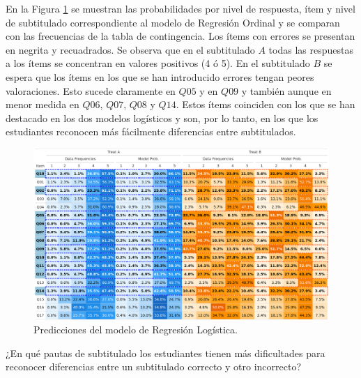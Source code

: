 \documentclass[
  12pt,
  a4paper,
  extrafontsizes,
  onecolumn,
  openright,
  table]{memoir}
\begin{document}
En la Figura \ref{fig-prob-compare} se muestran las probabilidades por
nivel de respuesta, ítem y nivel de subtitulado correspondiente al
modelo de Regresión Ordinal y se comparan con las frecuencias de la
tabla de contingencia. Los ítems con errores se presentan en negrita y
recuadrados. Se observa que en el subtitulado \(A\) todas las respuestas
a los ítems se concentran en valores positivos (4 ó 5). En el
subtitulado \(B\) se espera que los ítems en los que se han introducido
errores tengan peores valoraciones. Esto sucede claramente en \(Q05\) y
en \(Q09\) y también aunque en menor medida en \(Q06\), \(Q07\), \(Q08\)
y \(Q14\). Estos ítems coinciden con los que se han destacado en los dos
modelos logísticos y son, por lo tanto, en los que los estudiantes
reconocen más fácilmente diferencias entre subtitulados.

\begin{figure}[h]
\begin{adjustwidth}{-3.4cm}{}

\includegraphics[width=1.2\linewidth]{images/bayes-probs.png} \hfill{}

\caption{\label{fig-prob-compare}Predicciones del modelo de Regresión Logística.}

\end{adjustwidth}
\end{figure}

\begin{tcolorbox}[enhanced jigsaw, rightrule=.15mm, colback=white, toptitle=1mm, colbacktitle=quarto-callout-tip-color!10!white, toprule=.15mm, titlerule=0mm, bottomtitle=1mm, opacitybacktitle=0.6, colframe=quarto-callout-tip-color-frame, coltitle=black, leftrule=.75mm, bottomrule=.15mm, title=\textcolor{quarto-callout-tip-color}{\faLightbulb}\hspace{0.5em}{Objetivo específico}, arc=.35mm, breakable, opacityback=0, left=2mm]

¿En qué pautas de subtitulado los estudiantes tienen más dificultades
para reconocer diferencias entre un subtitulado correcto y otro
incorrecto?

\end{tcolorbox}
\end{document}

